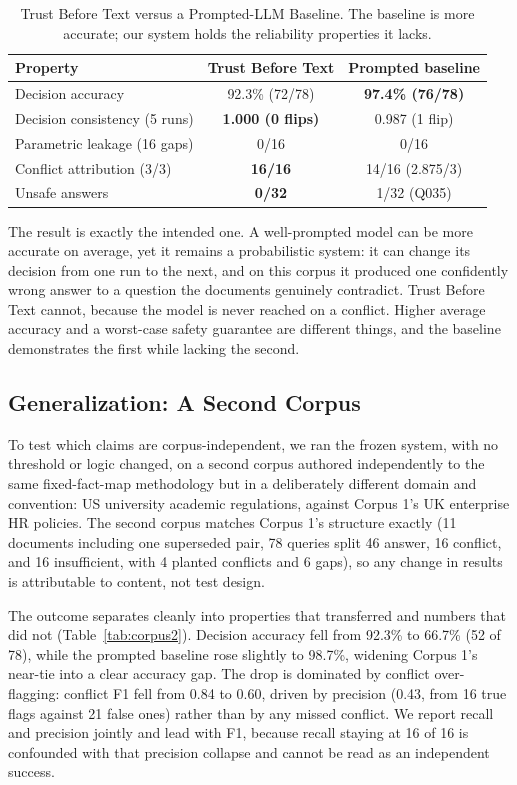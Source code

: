 \documentclass[conference]{IEEEtran}
\begin{document}
\begin{table}[htbp]
\caption{Trust Before Text versus a Prompted-LLM Baseline. The baseline is
more accurate; our system holds the reliability properties it lacks.}
\label{tab:headtohead}
\centering
\small
\begin{tabularx}{\columnwidth}{@{}X c c@{}}
\toprule
Property & Trust Before Text & Prompted baseline \\
\midrule
Decision accuracy              & 92.3\% (72/78)      & \textbf{97.4\% (76/78)} \\
Decision consistency (5 runs)  & \textbf{1.000 (0 flips)} & 0.987 (1 flip) \\
Parametric leakage (16 gaps)   & 0/16                & 0/16 \\
Conflict attribution (3/3)     & \textbf{16/16}      & 14/16 (2.875/3) \\
Unsafe answers                 & \textbf{0/32}       & 1/32 (Q035) \\
\bottomrule
\end{tabularx}
\end{table}

The result is exactly the intended one. A well-prompted model can be more
accurate on average, yet it remains a probabilistic system: it can change
its decision from one run to the next, and on this corpus it produced one
confidently wrong answer to a question the documents genuinely contradict.
Trust Before Text cannot, because the model is never reached on a conflict.
Higher average accuracy and a worst-case safety guarantee are different
things, and the baseline demonstrates the first while lacking the second.

\subsection{Generalization: A Second Corpus}
\label{sec:corpus2}
To test which claims are corpus-independent, we ran the frozen system, with no
threshold or logic changed, on a second corpus authored independently to the
same fixed-fact-map methodology but in a deliberately different domain and
convention: US university academic regulations, against Corpus 1's UK
enterprise HR policies. The second corpus matches Corpus 1's structure exactly
(11 documents including one superseded pair, 78 queries split 46 answer, 16
conflict, and 16 insufficient, with 4 planted conflicts and 6 gaps), so any
change in results is attributable to content, not test design.

The outcome separates cleanly into properties that transferred and numbers
that did not (Table~\ref{tab:corpus2}). Decision accuracy fell from 92.3\% to
66.7\% (52 of 78), while the prompted baseline rose slightly to 98.7\%,
widening Corpus 1's near-tie into a clear accuracy gap. The drop is dominated
by conflict over-flagging: conflict F1 fell from 0.84 to 0.60, driven by
precision (0.43, from 16 true flags against 21 false ones) rather than by any
missed conflict. We report recall and precision jointly and lead with F1,
because recall staying at 16 of 16 is confounded with that precision collapse
and cannot be read as an independent success.
\end{document}

